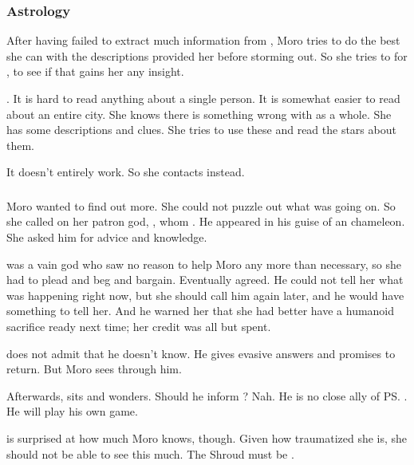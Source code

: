 \subsubsection{Astrology}
After having failed to extract much information from \Tiroco, Moro tries to do the best she can with the descriptions \Tiroco{} provided her before storming out. 
So she tries to  for \Tiroco, to see if that gains her any insight. 

. 
It is hard to read anything about a single person. 
It is somewhat easier to read about an entire city. 
She knows there is something wrong with \Malcur as a whole. 
She has some descriptions and clues. 
She tries to use these and read the stars about them. 

It doesn't entirely work. 
So she contacts \Nasshikerr{} instead. 





\subsubsection{\Nasshikerr}
Moro \Cobrel{} wanted to find out more. 
She could not puzzle out what was going on. 
So she called on her patron god, , whom .
He appeared in his guise of an chameleon.  
She asked him for advice and knowledge. 

\Nasshikerr{} was a vain god who saw no reason to help Moro any more than necessary, so she had to plead and beg and bargain. 
Eventually \Nasshikerr{} agreed. 
He could not tell her what was happening right now, but she should call him again later, and he would have something to tell her. 
And he warned her that she had better have a humanoid sacrifice ready next time; her credit was all but spent. 

\Nasshikerr{} does not admit that he doesn't know. 
He gives evasive answers and promises to return. 
But Moro sees through him. 

Afterwards, \Nasshikerr{} sits and wonders. 
Should he inform \Secherdamon? 
Nah. 
He is no close ally of \ps{\Secherdamon}. 
He will play his own game. 

\Nasshikerr{} is surprised at how much Moro knows, though. 
Given how traumatized she is, she should not be able to see this much. 
The Shroud must be . 

